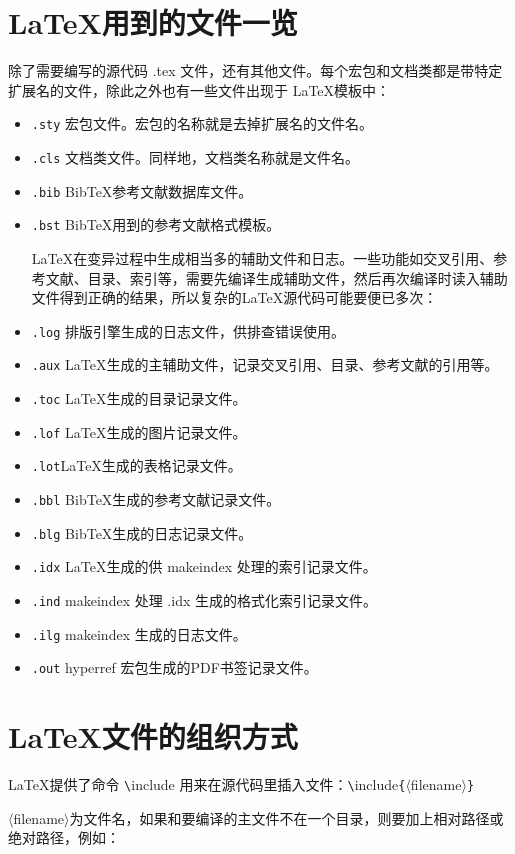 \documentclass[UTF8]{ctexart}
\begin{document}
\section{\LaTeX 用到的文件一览}
除了需要编写的源代码 .tex 文件，还有其他文件。每个宏包和文档类都是带特定扩展名的文件，除此之外也有一些文件出现于 \LaTeX 模板中：
\begin{itemize}
  \item \texttt{.sty} 宏包文件。宏包的名称就是去掉扩展名的文件名。
  \item \texttt{.cls} 文档类文件。同样地，文档类名称就是文件名。
  \item \texttt{.bib} Bib\TeX 参考文献数据库文件。
  \item \texttt{.bst} Bib\TeX 用到的参考文献格式模板。

\LaTeX 在变异过程中生成相当多的辅助文件和日志。一些功能如交叉引用、参考文献、目录、索引等，需要先编译生成辅助文件，然后再次编译时读入辅助文件得到正确的结果，所以复杂的\LaTeX 源代码可能要便已多次：
  \item \texttt{.log} 排版引擎生成的日志文件，供排查错误使用。
  \item \texttt{.aux} \LaTeX 生成的主辅助文件，记录交叉引用、目录、参考文献的引用等。
  \item \texttt{.toc} \LaTeX 生成的目录记录文件。
  \item \texttt{.lof} \LaTeX 生成的图片记录文件。
  \item \texttt{.lot}\LaTeX 生成的表格记录文件。
  \item \texttt{.bbl} Bib\TeX 生成的参考文献记录文件。
  \item \texttt{.blg} Bib\TeX 生成的日志记录文件。
  \item \texttt{.idx} \LaTeX 生成的供 makeindex 处理的索引记录文件。
  \item \texttt{.ind} makeindex 处理 .idx 生成的格式化索引记录文件。
  \item \texttt{.ilg} makeindex 生成的日志文件。
  \item \texttt{.out} hyperref 宏包生成的PDF书签记录文件。
\end{itemize}
\section{\LaTeX 文件的组织方式}
\LaTeX 提供了命令 \texttt{\textbackslash}include 用来在源代码里插入文件：\texttt{\textbackslash}include\texttt{\{}$\langle$filename$\rangle$\texttt{\}}

$\langle$filename$\rangle$为文件名，如果和要编译的主文件不在一个目录，则要加上相对路径或绝对路径，例如：
\end{document}
